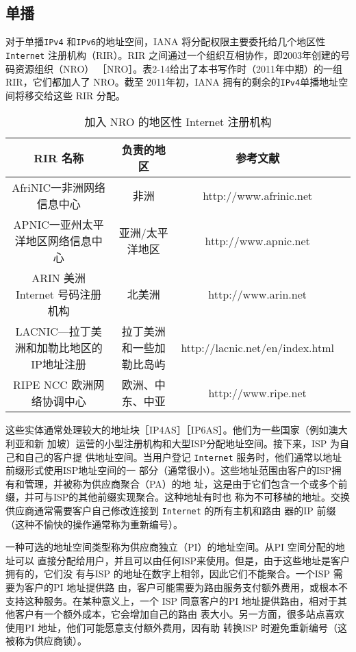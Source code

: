\subsection{单播}
对于单播\verb|IPv4| 和\verb|IPv6|的地址空间，IANA 将分配权限主要委托给几个地区性 \verb|Internet|
注册机构（RIR）。RIR 之间通过一个组织互相协作，即2003年创建的号码资源组织（NRO）
［NRO］。表2-14给出了本书写作时（2011年中期）的一组RIR，它们都加人了 NRO。截至
2011年初，IANA 拥有的剩余的\verb|IPv4|单播地址空间将移交给这些 RIR 分配。

\begin{table}[H]
    \centering
    \caption{加入 NRO 的地区性 Internet 注册机构}
    \begin{tabular}{c|c|c|c}
    \hline
        RIR 名称	&	负责的地区	&	参考文献 \\ \hline
        AfriNIC一非洲网络信息中心	&	非洲	&	http://www.afrinic.net \\ \hline
        APNIC一亚州太平洋地区网络信息中心	&	亚洲/太平洋地区	&	http://www.apnic.net \\ \hline
        ARIN 美洲 Internet 号码注册机构	&	北美洲	&	http://www.arin.net \\ \hline
        LACNIC—拉丁美洲和加勒比地区的IP地址注册	&	拉丁美洲和一些加勒比岛屿	&	http://lacnic.net/en/index.html \\ \hline
        RIPE NCC 欧洲网络协调中心	&	欧洲、中东、中亚	&	http://www.ripe.net \\ \hline
    \end{tabular}
\end{table}

这些实体通常处理较大的地址块［IP4AS］［IP6AS］。他们为一些国家（例如澳大利亚和新
加坡）运营的小型注册机构和大型ISP分配地址空间。接下来，ISP 为自己和自己的客户提
供地址空间。当用户登记 \verb|Internet| 服务时，他们通常以地址前缀形式使用ISP地址空间的一
部分（通常很小）。这些地址范围由客户的ISP拥有和管理，并被称为供应商聚合（PA）的地
址，这是由于它们包含一个或多个前缀，并可与ISP的其他前缀实现聚合。这种地址有时也
称为不可移植的地址。交换供应商通常需要客户自己修改连接到 \verb|Internet| 的所有主机和路由
器的IP 前缀（这种不愉快的操作通常称为重新编号）。

一种可选的地址空间类型称为供应商独立（PI）的地址空间。从PI 空间分配的地址可以
直接分配给用户，并且可以由任何ISP来使用。但是，由于这些地址是客户拥有的，它们没
有与ISP 的地址在数字上相邻，因此它们不能聚合。一个ISP 需要为客户的PI 地址提供路
由，客户可能需要为路由服务支付额外费用，或根本不支持这种服务。在某种意义上，一个
ISP 同意客户的PI 地址提供路由，相对于其他客户有一个额外成本，它会增加自己的路由
表大小。另一方面，很多站点喜欢使用PI 地址，他们可能愿意支付额外费用，因有助
转换ISP 时避免重新编号（这被称为供应商锁）。

